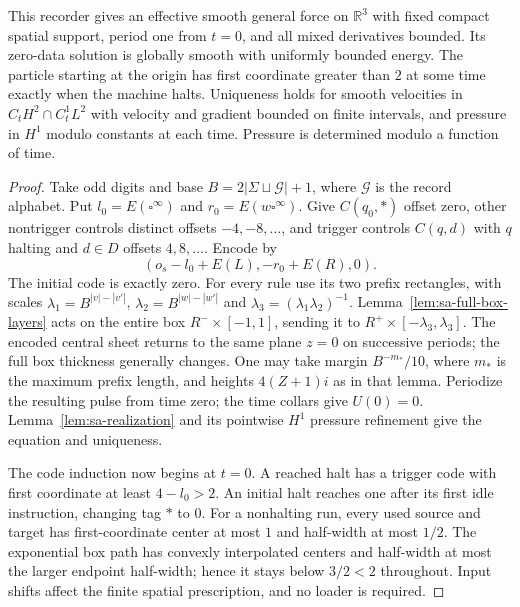 \begin{theorem}
\label{thm:sa-cell-records}
This recorder gives an effective smooth general force on $\mathbb R^3$
with fixed compact spatial support, period one from $t=0$, and all mixed
derivatives bounded.  Its zero-data solution is globally smooth with
uniformly bounded energy.  The particle starting at the origin has first
coordinate greater than $2$ at some time exactly when the machine halts.
Uniqueness holds for smooth velocities in $C_tH^2\cap C_t^1L^2$ with
velocity and gradient bounded on finite intervals, and pressure in $H^1$
modulo constants at each time.  Pressure is determined modulo a function
of time.
\end{theorem}
\begin{proof}
Take odd digits and base $B=2|\Sigma\sqcup\mathcal G|+1$, where
$\mathcal G$ is the record alphabet.  Put
$l_0=E(\square^\infty)$ and $r_0=E(w\square^\infty)$.
Give $C(q_0,*)$ offset zero, other nontrigger controls distinct offsets
$-4,-8,\ldots$, and trigger controls
$C(q,d)$ with $q$ halting and $d\in D$ offsets $4,8,\ldots$.
Encode by
\begin{equation}\label{eq:sa-cell-records-5}
 (o_s-l_0+E(L),-r_0+E(R),0).
\end{equation}
The initial code is exactly zero.  For every rule use its two prefix
rectangles, with scales
$\lambda_1=B^{|v|-|v'|}$, $\lambda_2=B^{|w|-|w'|}$ and
$\lambda_3=(\lambda_1\lambda_2)^{-1}$.
Lemma~\ref{lem:sa-full-box-layers} acts on the entire box
$R^-\times[-1,1]$, sending it to $R^+\times[-\lambda_3,\lambda_3]$.
The encoded central sheet returns to the same plane $z=0$ on successive
periods; the full box thickness generally changes.  One may take margin $B^{-m_*}/10$,
where $m_*$ is the maximum prefix length, and heights $4(Z+1)i$ as in
that lemma.  Periodize the resulting pulse from time zero; the time
collars give $U(0)=0$.  Lemma~\ref{lem:sa-realization} and its pointwise
$H^1$ pressure refinement give the equation and uniqueness.

The code induction now begins at $t=0$.  A reached halt has a trigger
code with first coordinate at least $4-l_0>2$.  An initial halt reaches
one after its first idle instruction, changing tag $*$ to $0$.
For a nonhalting run, every used source and target has first-coordinate
center at most $1$ and half-width at most $1/2$.  The exponential box
path has convexly interpolated centers and half-width at most the larger
endpoint half-width; hence it stays below $3/2<2$ throughout.  Input
shifts affect the finite spatial prescription, and no loader is required.
\end{proof}

